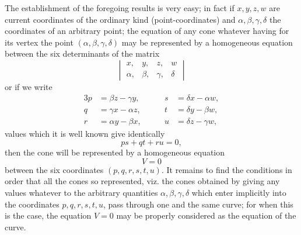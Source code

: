 \documentclass[11pt,a4paper]{article}
\theoremstyle{plain}
\begin{document}
The establishment of the foregoing results is very easy; in fact if $x, y, z, w$ are current coordinates of the ordinary kind (point-coordinates) and $\alpha, \beta, \gamma, \delta$ the coordinates of an arbitrary point; the equation of any cone whatever having for its vertex the point $(\alpha, \beta, \gamma, \delta)$ may be represented by a homogeneous equation between the six determinants of the matrix
\[
\begin{vmatrix}
x, & y, & z, & w \\
\alpha, & \beta, & \gamma, & \delta
\end{vmatrix}
\]
or if we write
\begin{alignat*}{3}
p &= \beta z - \gamma y, &\qquad s &= \delta x - \alpha w,\\
q &= \gamma x - \alpha z, &\qquad t &= \delta y - \beta w,\\
r &= \alpha y - \beta x, &\qquad u &= \delta z - \gamma w,
\end{alignat*}
values which it is well known give identically
\[
ps + qt + ru = 0,
\]
then the cone will be represented by a homogeneous equation
\[
V = 0
\]
between the six coordinates $(p, q, r, s, t, u)$. It remains to find the conditions in order that all the cones so represented, viz. the cones obtained by giving any values whatever to the arbitrary quantities $\alpha, \beta, \gamma, \delta$ which enter implicitly into the coordinates $p, q, r, s, t, u$, pass through one and the same curve; for when this is the case, the equation $V = 0$ may be properly considered as the equation of the curve.
\end{document}
